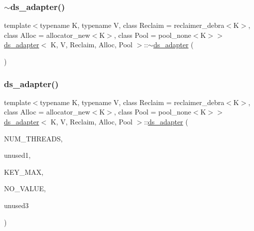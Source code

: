 \mbox{\label{classds__adapter_a366f46dd39d59f2d4a147589f5fd98e3}} 
\subsubsection{\texorpdfstring{$\sim$ds\+\_\+adapter()}{~ds\_adapter()}\hspace{0.1cm}{\footnotesize\ttfamily [15/26]}}
{\footnotesize\ttfamily template$<$typename K, typename V, class Reclaim = reclaimer\+\_\+debra$<$\+K$>$, class Alloc = allocator\+\_\+new$<$\+K$>$, class Pool = pool\+\_\+none$<$\+K$>$$>$ \\
\hyperlink{classds__adapter}{ds\+\_\+adapter}$<$ K, V, Reclaim, Alloc, Pool $>$\+::$\sim$\hyperlink{classds__adapter}{ds\+\_\+adapter} (\begin{DoxyParamCaption}{ }\end{DoxyParamCaption})\hspace{0.3cm}{\ttfamily [inline]}}

\mbox{\label{classds__adapter_aa3d05821af0b337e15dd4756125bc7af}} 
\subsubsection{\texorpdfstring{ds\+\_\+adapter()}{ds\_adapter()}\hspace{0.1cm}{\footnotesize\ttfamily [16/27]}}
{\footnotesize\ttfamily template$<$typename K, typename V, class Reclaim = reclaimer\+\_\+debra$<$\+K$>$, class Alloc = allocator\+\_\+new$<$\+K$>$, class Pool = pool\+\_\+none$<$\+K$>$$>$ \\
\hyperlink{classds__adapter}{ds\+\_\+adapter}$<$ K, V, Reclaim, Alloc, Pool $>$\+::\hyperlink{classds__adapter}{ds\+\_\+adapter} (\begin{DoxyParamCaption}\item[{const int}]{N\+U\+M\+\_\+\+T\+H\+R\+E\+A\+DS,  }\item[{const K \&}]{unused1,  }\item[{const K \&}]{K\+E\+Y\+\_\+\+M\+AX,  }\item[{const V \&}]{N\+O\+\_\+\+V\+A\+L\+UE,  }\item[{\hyperlink{classRandomFNV1A}{Random\+F\+N\+V1A} $\ast$const}]{unused3 }\end{DoxyParamCaption})\hspace{0.3cm}{\ttfamily [inline]}}

